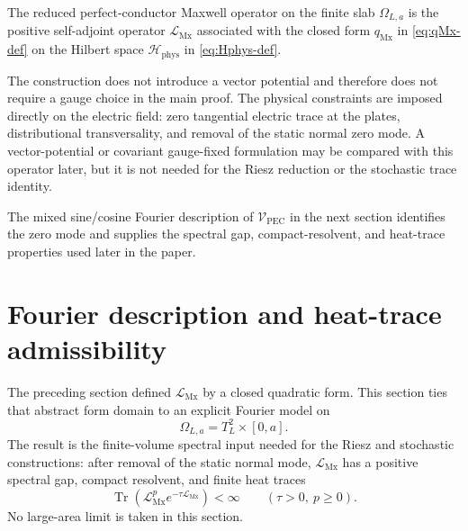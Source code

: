 \documentclass[11pt]{article}
\providecommand{\Tr}{\operatorname{Tr}}
\providecommand{\paren}[1]{\left(#1\right)}
\providecommand{\OmegaLa}{\Omega_{L,a}}
\providecommand{\TtwoL}{T_L^2}
\providecommand{\Hphys}{\mathcal H_{\mathrm{phys}}}
\providecommand{\VPEC}{\mathcal V_{\mathrm{PEC}}}
\providecommand{\qMx}{q_{\mathrm{Mx}}}
\providecommand{\LMx}{\mathcal L_{\mathrm{Mx}}}
\numberwithin{equation}{section}
\begin{document}
\begin{definition}
\label{def:reduced-pec-maxwell-operator}
The reduced perfect-conductor Maxwell operator on the finite slab \(\OmegaLa\) is the positive self-adjoint operator \(\LMx\) associated with the closed form \(\qMx\) in \eqref{eq:qMx-def} on the Hilbert space \(\Hphys\) in \eqref{eq:Hphys-def}.
\end{definition}

\begin{remark}
\label{rem:electric-field-no-gauge}
The construction does not introduce a vector potential and therefore does not require a gauge choice in the main proof.  The physical constraints are imposed directly on the electric field: zero tangential electric trace at the plates, distributional transversality, and removal of the static normal zero mode.  A vector-potential or covariant gauge-fixed formulation may be compared with this operator later, but it is not needed for the Riesz reduction or the stochastic trace identity.
\end{remark}

\begin{remark}
\label{rem:maxwell-operator-deferred}
The mixed sine/cosine Fourier description of \(\VPEC\) in the next section
identifies the zero mode and supplies the spectral gap, compact-resolvent, and
heat-trace properties used later in the paper.
\end{remark}
\section{Fourier description and heat-trace admissibility}
\label{sec:fourier-domain-heat-trace}

The preceding section defined \(\LMx\) by a closed quadratic form.  This section ties that abstract form domain to an explicit Fourier model on
\[
    \OmegaLa=\TtwoL\times[0,a].
\]
The result is the finite-volume spectral input needed for the Riesz and stochastic constructions: after removal of the static normal mode, \(\LMx\) has a positive spectral gap, compact resolvent, and finite heat traces
\[
    \Tr\paren{\LMx^p e^{-\tau\LMx}}<\infty
    \qquad(\tau>0,\ p\ge0).
\]
No large-area limit is taken in this section.
\end{document}
